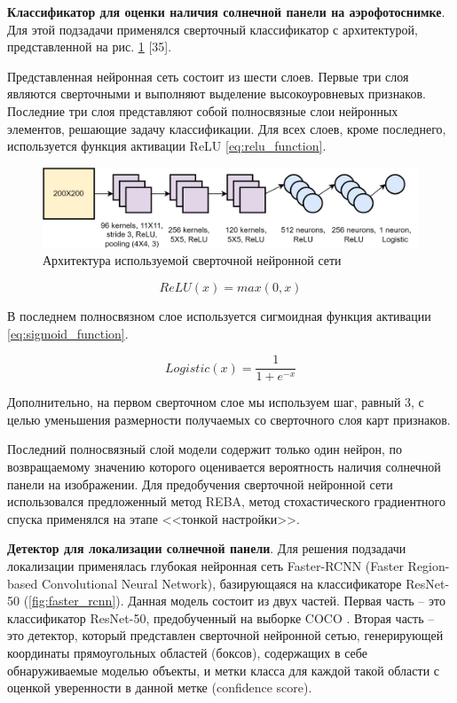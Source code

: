\textbf{Классификатор для оценки наличия солнечной панели на аэрофотоснимке}. Для этой подзадачи применялся сверточный классификатор с архитектурой, представленной на рис. \ref{fig:used_cnn} [35]. 

Представленная нейронная сеть состоит из шести слоев. Первые три слоя являются сверточными и выполняют выделение высокоуровневых признаков. Последние три слоя представляют собой полносвязные слои нейронных элементов, решающие задачу классификации. Для всех слоев, кроме последнего, используется функция активации ReLU \ref{eq:relu_function}.

\begin{figure}[ht]
	\centering
	\includegraphics[width=17cm]{man-source/images/ch4/pic4-19.png}
	\caption{Архитектура используемой сверточной нейронной сети}
	\label{fig:used_cnn}
\end{figure}

\begin{equation}
    \label{eq:relu_function}
    ReLU(x) = max(0, x)
\end{equation}

В последнем полносвязном слое используется сигмоидная функция активации \ref{eq:sigmoid_function}.

\begin{equation}
    \label{eq:sigmoid_function}
    Logistic(x) = \frac{1}{1+e^{-x}}
\end{equation}

Дополнительно, на первом сверточном слое мы используем шаг, равный 3, с целью уменьшения размерности получаемых со сверточного слоя карт признаков.

Последний полносвязный слой модели содержит только один нейрон, по возвращаемому значению которого оценивается вероятность наличия солнечной панели на изображении. Для предобучения сверточной нейронной сети использовался предложенный метод REBA, метод стохастического градиентного спуска применялся на этапе <<тонкой настройки>>. 

\textbf{Детектор для локализации солнечной панели}. Для решения подзадачи локализации применялась глубокая нейронная сеть Faster-RCNN (Faster Region-based Convolutional Neural Network), базирующаяся на классификаторе ResNet-50 (\ref{fig:faster_rcnn}). Данная модель состоит из двух частей. Первая часть -- это классификатор ResNet-50, предобученный на выборке COCO \cite{lin2015}. Вторая часть -- это детектор, который представлен сверточной нейронной сетью, генерирующей координаты прямоугольных областей (боксов), содержащих в себе обнаруживаемые моделью объекты, и метки класса для каждой такой области с оценкой уверенности в данной метке (confidence score).

